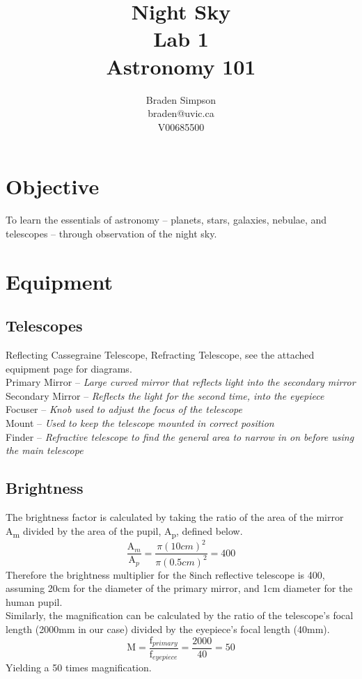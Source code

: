 \documentclass{article}
\begin{document}
\title{Night Sky \\ Lab 1 \\ Astronomy 101}
\author{
Braden Simpson \\ braden@uvic.ca \\ V00685500
}
\maketitle

\section{Objective}
To learn the essentials of astronomy -- planets, stars, galaxies, nebulae, and telescopes -- through observation of the night sky.
\section{Equipment}
\subsection{Telescopes}
Reflecting Cassegraine Telescope, Refracting Telescope, see the attached equipment page for diagrams.\\
Primary Mirror -- \emph{Large curved mirror that reflects light into the secondary mirror} \\
Secondary Mirror -- \emph{Reflects the light for the second time, into the eyepiece} \\
Focuser -- \emph{Knob used to adjust the focus of the telescope} \\
Mount -- \emph{Used to keep the telescope mounted in correct position} \\
Finder -- \emph{Refractive telescope to find the general area to narrow in on before using the main telescope}
\subsection{Brightness}
The brightness factor is calculated by taking the ratio of the area of the mirror A\textsubscript{m} divided by the area of the pupil, A\textsubscript{p}, defined below.
\begin{equation}
\frac{\text{A}_{m}}{\text{A}_{p}} = \frac{\pi (10cm)^2}{\pi (0.5cm)^2} = 400
\end{equation}
Therefore the brightness multiplier for the 8inch reflective telescope is 400, assuming 20cm for the diameter of the primary mirror, and 1cm diameter for the human pupil. \\
Similarly, the magnification can be calculated by the ratio of the telescope's focal length (2000mm in our case) divided by the eyepiece's focal length (40mm).
\begin{equation}
\text{M} = \frac{\text{f}_{primary}}{\text{f}_{eyepiece}} = \frac{2000}{40} = 50
\end{equation}
Yielding a 50 times magnification.
\end{document}
